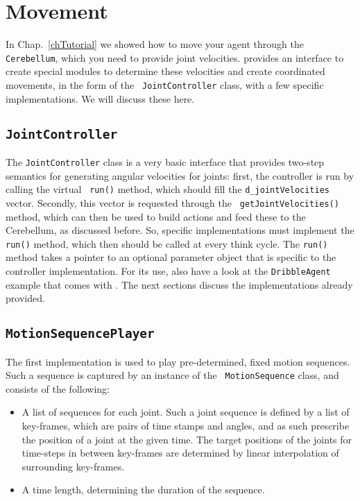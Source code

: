 
\chapter{Movement}
\label{cha:movement}

In Chap.~\ref{chTutorial} we showed how to move your agent through the
{\tt Cerebellum}, which you need to provide joint velocities. \libbats
provides an interface to create special modules to determine these
velocities and create coordinated movements, in the form of the {\tt
  JointController} class, with a few specific implementations. We will
discuss these here.

\section{{\tt JointController}}
\label{sec:tt-jointcontroller}

The {\tt JointController} class is a very basic interface that
provides two-step semantics for generating angular velocities for
joints: first, the controller is run by calling the virtual {\tt
  run()} method, which should fill the {\tt d\_jointVelocities}
vector. Secondly, this vector is requested through the {\tt
  getJointVelocities()} method, which can then be used to build
actions and feed these to the Cerebellum, as discussed before. So,
specific implementations must implement the {\tt run()} method, which
then should be called at every think cycle. The {\tt run()} method
takes a pointer to an optional parameter object that is specific to
the controller implementation. For its use, also have a look at the
{\tt DribbleAgent} example that comes with \libbats. The next sections
discuss the implementations already provided.

\section{{\tt MotionSequencePlayer}}
\label{sec:tt-moti}

The first implementation is used to play pre-determined, fixed motion
sequences. Such a sequence is captured by an instance of the {\tt
  MotionSequence} class, and consists of the following:
\begin{itemize}
\item A list of sequences for each joint. Such a joint sequence is
  defined by a list of key-frames, which are pairs of time stamps and
  angles, and as such prescribe the position of a joint at the given
  time. The target positions of the joints for time-steps in between
  key-frames are determined by linear interpolation of surrounding
  key-frames.
\item A time length, determining the duration of the sequence.
\end{itemize}

